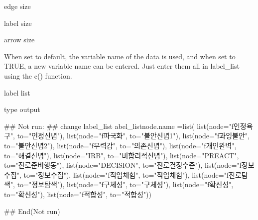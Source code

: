 \documentclass[a4paper]{book}
\begin{document}
\begin{Arguments}
\begin{ldescription}
\item[\code{edge.label.cex}] edge size

\item[\code{label.cex}] label size

\item[\code{asize}] arrow size

\item[\code{name\_change}] When set to default, the variable name of the data is used, and when set to TRUE, a new variable name can be entered. Just enter them all in label\_list using the c() function.

\item[\code{label\_list}] label list

\item[\code{type}] type output
\end{ldescription}
\end{Arguments}
%
\begin{Examples}
\begin{ExampleCode}

\#\# Not run: 
## change label_list
abel_listnode.name =list(
  list(node="f인정욕구", to="인정신념"),
  list(node="f파국화",  to="불안신념1"),
  list(node="f과잉불안", to="불안신념2"),
  list(node="f무력감",  to="의존신념"),
  list(node="f개인완벽", to="해결신념"),
  list(node="IRB",  to="비합리적신념"),
  list(node="PREACT",  to="진로준비행동"),
  list(node="DECISION",  to="진로결정수준"),
  list(node="f정보수집",  to="정보수집"),
  list(node="f직업체험",  to="직업체험"),
  list(node="f진로탐색",  to="정보탐색"),
  list(node="f구체성",  to="구체성"),
  list(node="f확신성",  to="확신성"),
  list(node="f적합성",  to="적합성"))

## End(Not run)


\end{ExampleCode}
\end{Examples}
\end{document}
